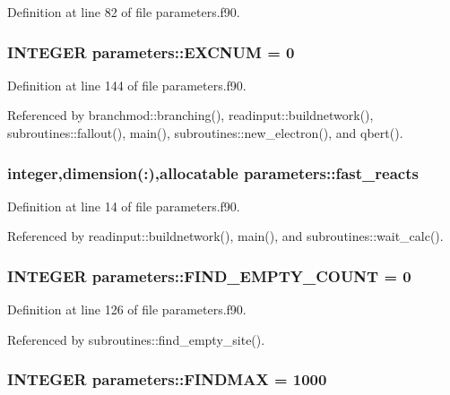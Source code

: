 Definition at line 82 of file parameters.f90.\hypertarget{namespaceparameters_aed6a003faa9e073d8fb8b860e98c7bfd}{
\subsubsection[{EXCNUM}]{\setlength{\rightskip}{0pt plus 5cm}INTEGER {\bf parameters::EXCNUM} = 0}}
\label{namespaceparameters_aed6a003faa9e073d8fb8b860e98c7bfd}


Definition at line 144 of file parameters.f90.

Referenced by branchmod::branching(), readinput::buildnetwork(), subroutines::fallout(), main(), subroutines::new\_\-electron(), and qbert().\hypertarget{namespaceparameters_a8706bba63c5517e5b5e5b2cf0487db4b}{
\subsubsection[{fast\_\-reacts}]{\setlength{\rightskip}{0pt plus 5cm}integer,dimension(:),allocatable {\bf parameters::fast\_\-reacts}}}
\label{namespaceparameters_a8706bba63c5517e5b5e5b2cf0487db4b}


Definition at line 14 of file parameters.f90.

Referenced by readinput::buildnetwork(), main(), and subroutines::wait\_\-calc().\hypertarget{namespaceparameters_aca6da9a32c037c09b143a1a14e6ee3a7}{
\subsubsection[{FIND\_\-EMPTY\_\-COUNT}]{\setlength{\rightskip}{0pt plus 5cm}INTEGER {\bf parameters::FIND\_\-EMPTY\_\-COUNT} = 0}}
\label{namespaceparameters_aca6da9a32c037c09b143a1a14e6ee3a7}


Definition at line 126 of file parameters.f90.

Referenced by subroutines::find\_\-empty\_\-site().\hypertarget{namespaceparameters_a8bb87362a7d863fb6078dee2db1dd2a7}{
\subsubsection[{FINDMAX}]{\setlength{\rightskip}{0pt plus 5cm}INTEGER {\bf parameters::FINDMAX} = 1000}}
\label{namespaceparameters_a8bb87362a7d863fb6078dee2db1dd2a7}


